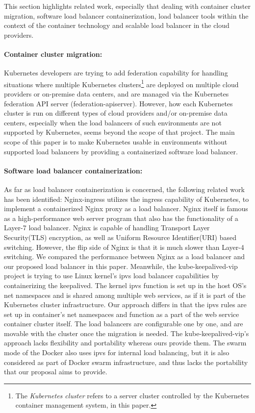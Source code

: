 This section highlights related work, especially that dealing with container cluster migration, 
software load balancer containerization, load balancer tools within the context of the container technology and scalable load balancer in the cloud providers.

\paragraph{\bf Container cluster migration:}

Kubernetes developers are trying to add federation\cite{K8sFederation2017} capability for handling situations 
where multiple Kubernetes clusters\footnote{The {\em Kubernetes cluster} refers to a server cluster 
controlled by the Kubernetes container management system, in this paper.} 
are deployed on multiple cloud providers or on-premise data centers, 
and are managed via the Kubernetes federation API server (federation-apiserver). 
However, how each Kubernetes cluster is run on different types of cloud providers
and/or on-premise data centers, especially when the load balancers of such environments are not supported by Kubernetes, 
seems beyond the scope of that project. 
The main scope of this paper is to make Kubernetes usable in environments 
without supported load balancers by providing a containerized software load balancer.

\paragraph{\bf Software load balancer containerization:}
As far as load balancer containerization is concerned, the following related work has been identified:
Nginx-ingress\cite{Pleshakov2016,NginxInc2016} utilizes the ingress\cite{K8sIngress2017} capability of Kubernetes, 
to implement a containerized Nginx proxy as a load balancer. Nginx itself is famous as a high-performance web server program
that also has the functionality of a Layer-7 load balancer. Nginx is capable of handling Transport Layer Security(TLS) encryption, 
as well as Uniform Resource Identifier(URI) based switching. However, the flip side of Nginx is that it is much slower than Layer-4 switching.
We compared the performance between Nginx as a load balancer and our proposed load balancer in this paper.
%
Meanwhile, the kube-keepalived-vip\cite{Prashanth2016} project is trying to use Linux kernel's ipvs\cite{Zhang2000} 
load balancer capabilities by containerizing the keepalived\cite{ACassen2016}.
The kernel ipvs function is set up in the host OS's net namespaces and is shared among multiple web services,
as if it is part of the Kubernetes cluster infrastructure.
Our approach differs in that the ipvs rules are set up in container's net namespaces 
and function as a part of the web service container cluster itself.
The load balancers are configurable one by one, and are  movable with the cluster once the migration is needed.
The kube-keepalived-vip's approach lacks flexibility and portability whereas ours provide them.
%
The swarm mode of the Docker\cite{DockerCoreEngineering2016,DockerInc2017} also uses ipvs for internal load balancing,
but it is also considered as part of Docker swarm infrastructure, 
and thus lacks the portability that our proposal aims to provide.

